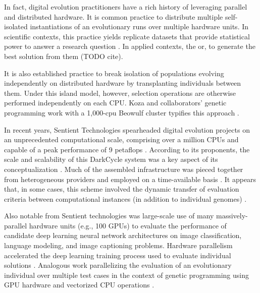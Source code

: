 In fact, digital evolution practitioners have a rich history of leveraging parallel and distributed hardware.
It is common practice to distribute multiple self-isolated instantiations of an evolutionary runs over multiple hardware units.
In scientific contexts, this practice yields replicate datasets that provide statistical power to answer a research question \citep{dolson2017spatial}.
In applied contexts, the
or,  to generate  the best solution from them (TODO cite).

It is also established practice to break isolation of populations evolving independently on distributed hardware by transplanting individuals between them.
Under this island model, however, selection operations are otherwise performed independently on each CPU.
Koza and collaborators' genetic programming work with a 1,000-cpu Beowulf cluster typifies this approach \citep{bennett1999building}.

In recent years, Sentient Technologies spearheaded digital evolution projects on an unprecedented computational scale, comprising over a million CPUs and capable of a peak performance of 9 petaflops \citep{miikkulainen2019evolving} .
According to its proponents, the scale and scalability of this DarkCycle system was a key aspect of its conceptualization \citep{gilbert_2015}.
Much of the assembled infrastructure was pieced together from heterogeneous providers and employed on a time-available basis \citep{blondeau2012distributed}.
It appears that, in some cases, this scheme involved the dynamic transfer of evaluation criteria between computational instances (in addition to individual genomes) \citep{hodjat2013distributed}.

Also notable from Sentient technologies was large-scale use of many massively-parallel hardware units (e.g., 100 GPUs) to evaluate the performance of candidate deep learning neural network architectures on image classification, language modeling, and image captioning problems.
Hardware parallelism accelerated the deep learning training process used to evaluate individual solutions \citep{miikkulainen2019evolving}.
Analogous work parallelizing the evaluation of an evolutionary individual over multiple test cases in the context of genetic programming using GPU hardware and vectorized CPU operations \citep{harding2007fast2, langdon2019continuous}.


